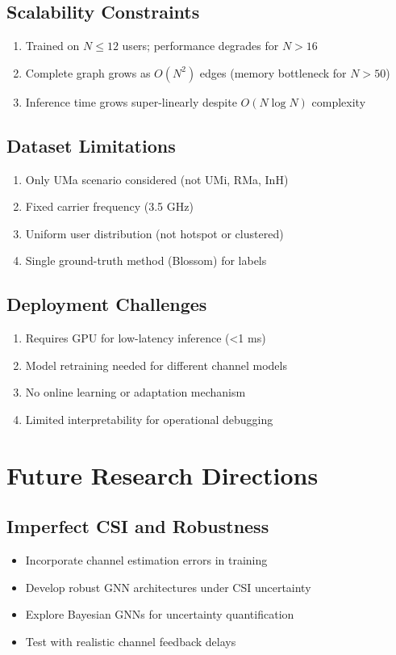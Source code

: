 \subsection{Scalability Constraints}
\begin{enumerate}
    \item Trained on $N \leq 12$ users; performance degrades for $N > 16$
    \item Complete graph grows as $O(N^2)$ edges (memory bottleneck for $N > 50$)
    \item Inference time grows super-linearly despite $O(N \log N)$ complexity
\end{enumerate}

\subsection{Dataset Limitations}
\begin{enumerate}
    \item Only UMa scenario considered (not UMi, RMa, InH)
    \item Fixed carrier frequency (3.5 GHz)
    \item Uniform user distribution (not hotspot or clustered)
    \item Single ground-truth method (Blossom) for labels
\end{enumerate}

\subsection{Deployment Challenges}
\begin{enumerate}
    \item Requires GPU for low-latency inference (<1 ms)
    \item Model retraining needed for different channel models
    \item No online learning or adaptation mechanism
    \item Limited interpretability for operational debugging
\end{enumerate}

\section{Future Research Directions}

\subsection{Imperfect CSI and Robustness}
\begin{itemize}
    \item Incorporate channel estimation errors in training
    \item Develop robust GNN architectures under CSI uncertainty
    \item Explore Bayesian GNNs for uncertainty quantification
    \item Test with realistic channel feedback delays
\end{itemize}

